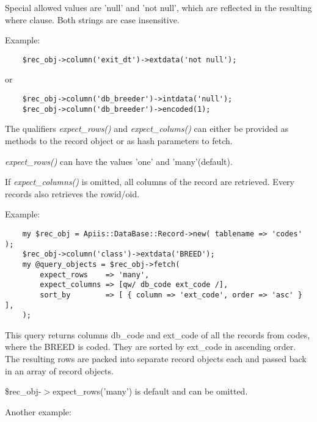 Special allowed values are 'null' and 'not null', which are reflected in the
resulting where clause. Both strings are case insensitive.



Example:

\begin{verbatim}
    $rec_obj->column('exit_dt')->extdata('not null');
\end{verbatim}


or

\begin{verbatim}
    $rec_obj->column('db_breeder')->intdata('null');
    $rec_obj->column('db_breeder')->encoded(1);
\end{verbatim}


The qualifiers \textit{expect\_rows()} and \textit{expect\_colums()} can either be
provided as methods to the record object or as hash parameters to fetch.



\textit{expect\_rows()} can have the values 'one' and 'many'(default).



If \textit{expect\_columns()} is omitted, all columns of the record are retrieved.
Every records also retrieves the rowid/oid.



Example:

\begin{verbatim}
    my $rec_obj = Apiis::DataBase::Record->new( tablename => 'codes' );
    $rec_obj->column('class')->extdata('BREED');
    my @query_objects = $rec_obj->fetch(
        expect_rows    => 'many',
        expect_columns => [qw/ db_code ext_code /],
        sort_by        => [ { column => 'ext_code', order => 'asc' } ],
    );
\end{verbatim}


This query returns columns db\_code and ext\_code of all the records from codes,
where the BREED is coded. They are sorted by ext\_code in ascending order.
The resulting rows are packed into separate record objects each and passed
back in an array of record objects.



\$rec\_obj-$>$expect\_rows('many') is default and can be omitted.



Another example:

